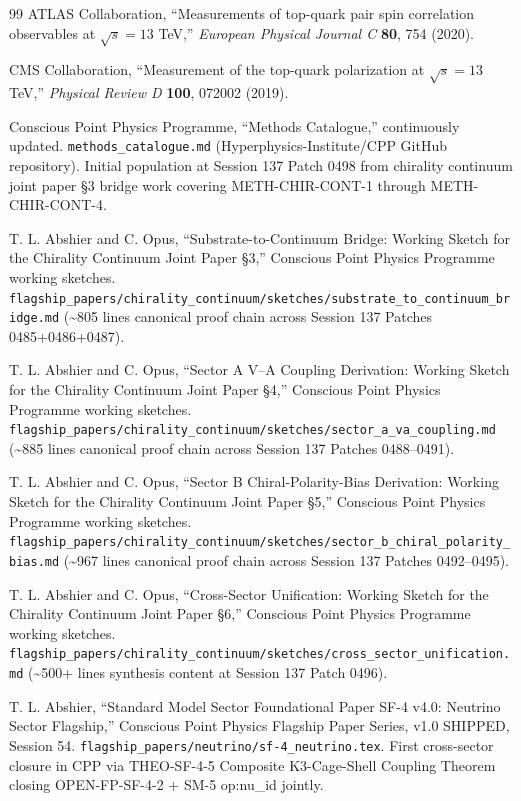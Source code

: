 \documentclass[11pt,letterpaper]{article}
\begin{document}
\begin{thebibliography}{99}
ATLAS Collaboration, ``Measurements of top-quark pair spin correlation observables at $\sqrt{s} = 13$ TeV,'' \emph{European Physical Journal C} \textbf{80}, 754 (2020).

CMS Collaboration, ``Measurement of the top-quark polarization at $\sqrt{s} = 13$ TeV,'' \emph{Physical Review D} \textbf{100}, 072002 (2019).

Conscious Point Physics Programme, ``Methods Catalogue,'' continuously updated. \texttt{methods\_catalogue.md} (Hyperphysics-Institute/CPP GitHub repository). Initial population at Session 137 Patch 0498 from chirality continuum joint paper §3 bridge work covering METH-CHIR-CONT-1 through METH-CHIR-CONT-4.

T. L. Abshier and C. Opus, ``Substrate-to-Continuum Bridge: Working Sketch for the Chirality Continuum Joint Paper §3,'' Conscious Point Physics Programme working sketches. \texttt{flagship\_papers/chirality\_continuum/sketches/substrate\_to\_continuum\_bridge.md} (\textasciitilde{}805 lines canonical proof chain across Session 137 Patches 0485+0486+0487).

T. L. Abshier and C. Opus, ``Sector A V--A Coupling Derivation: Working Sketch for the Chirality Continuum Joint Paper §4,'' Conscious Point Physics Programme working sketches. \texttt{flagship\_papers/chirality\_continuum/sketches/sector\_a\_va\_coupling.md} (\textasciitilde{}885 lines canonical proof chain across Session 137 Patches 0488--0491).

T. L. Abshier and C. Opus, ``Sector B Chiral-Polarity-Bias Derivation: Working Sketch for the Chirality Continuum Joint Paper §5,'' Conscious Point Physics Programme working sketches. \texttt{flagship\_papers/chirality\_continuum/sketches/sector\_b\_chiral\_polarity\_bias.md} (\textasciitilde{}967 lines canonical proof chain across Session 137 Patches 0492--0495).

T. L. Abshier and C. Opus, ``Cross-Sector Unification: Working Sketch for the Chirality Continuum Joint Paper §6,'' Conscious Point Physics Programme working sketches. \texttt{flagship\_papers/chirality\_continuum/sketches/cross\_sector\_unification.md} (\textasciitilde{}500+ lines synthesis content at Session 137 Patch 0496).

T. L. Abshier, ``Standard Model Sector Foundational Paper SF-4 v4.0: Neutrino Sector Flagship,'' Conscious Point Physics Flagship Paper Series, v1.0 SHIPPED, Session 54. \texttt{flagship\_papers/neutrino/sf-4\_neutrino.tex}. First cross-sector closure in CPP via THEO-SF-4-5 Composite K3-Cage-Shell Coupling Theorem closing OPEN-FP-SF-4-2 + SM-5 op:nu\_id jointly.


\end{thebibliography}
\end{document}
